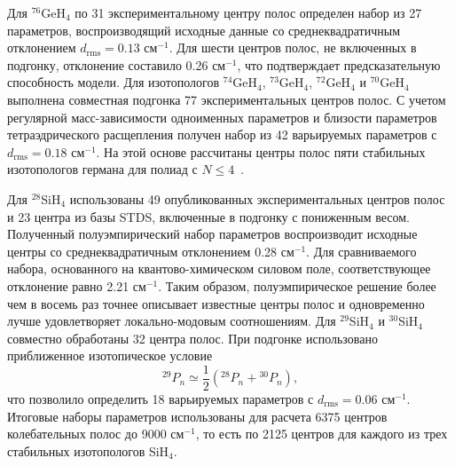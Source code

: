Для ${}^{76}$GeH$_4$ по 31 экспериментальному центру полос определен набор из 27 параметров,
воспроизводящий исходные данные со среднеквадратичным отклонением
$d_{\textrm{rms}}=0.13$ см$^{-1}$. Для шести центров полос, не включенных в подгонку, отклонение
составило 0.26 см$^{-1}$, что подтверждает предсказательную способность модели. Для изотопологов
${}^{74}$GeH$_4$, ${}^{73}$GeH$_4$, ${}^{72}$GeH$_4$ и ${}^{70}$GeH$_4$ выполнена совместная
подгонка 77 экспериментальных центров полос. С учетом регулярной масс-зависимости одноименных
параметров и близости параметров тетраэдрического расщепления получен набор из 42 варьируемых
параметров с $d_{\textrm{rms}}=0.18$ см$^{-1}$. На этой основе рассчитаны центры полос пяти
стабильных изотопологов германа для полиад с $N\leq4$~\cite{ulen1,ulen2}.

Для ${}^{28}$SiH$_4$ использованы 49 опубликованных экспериментальных центров полос и 23 центра из
базы STDS, включенные в подгонку с пониженным весом. Полученный полуэмпирический набор параметров
воспроизводит исходные центры со среднеквадратичным отклонением 0.28 см$^{-1}$. Для сравниваемого
набора, основанного на квантово-химическом силовом поле, соответствующее отклонение равно
2.21 см$^{-1}$. Таким образом, полуэмпирическое решение более чем в восемь раз точнее описывает
известные центры полос и одновременно лучше удовлетворяет локально-модовым соотношениям. Для
${}^{29}$SiH$_4$ и ${}^{30}$SiH$_4$ совместно обработаны 32 центра полос. При подгонке использовано
приближенное изотопическое условие
\begin{equation}
{}^{29}P_n\simeq\frac{1}{2}\left({}^{28}P_n+{}^{30}P_n\right),
\end{equation}
что позволило определить 18 варьируемых параметров с $d_{\textrm{rms}}=0.06$ см$^{-1}$. Итоговые
наборы параметров использованы для расчета 6375 центров колебательных полос до 9000 см$^{-1}$, то
есть по 2125 центров для каждого из трех стабильных изотопологов SiH$_4$.

